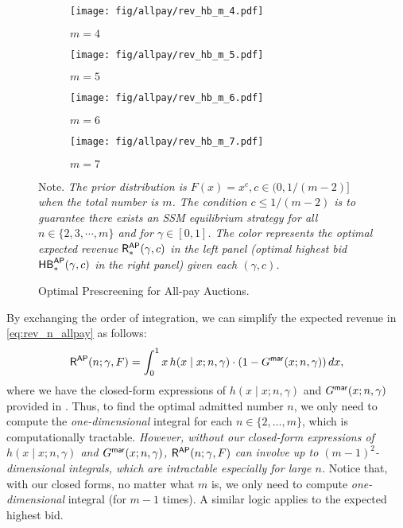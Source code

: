 \begin{figure}[ht]
    \centering
    \begin{subfigure}[b]{0.49\textwidth} %
    \texttt{[image: fig/allpay/rev\_hb\_m\_4.pdf]}
    \caption{$m=4$}
    \label{fig:rev_m_4_allpay}
    \end{subfigure}
    \hfill 
    \begin{subfigure}[b]{0.49\textwidth}
    \texttt{[image: fig/allpay/rev\_hb\_m\_5.pdf]}
    \caption{$m=5$}
    \label{fig:hb_m_5_allpay}
    \end{subfigure}

\begin{subfigure}[b]{0.49\textwidth}
    \texttt{[image: fig/allpay/rev\_hb\_m\_6.pdf]}
    \caption{$m=6$}
    \label{fig:hb_m_6_allpay}
    \end{subfigure}
    \hfill
    \begin{subfigure}[b]{0.49\textwidth}
    \texttt{[image: fig/allpay/rev\_hb\_m\_7.pdf]}
    \caption{$m=7$}
    \label{fig:hb_m_7_allpay}
    \end{subfigure}
    
    \caption{Optimal Prescreening for All-pay Auctions. 
    }
    \label{fig:general_m_allpay}
\vspace{0.5em}    
      Note. \textit{The prior distribution is $F(x)=x^c,c\in(0,1/(m-2)]$ when the total number is $m$. The condition $c\leq 1/(m-2)$ is to guarantee there exists an SSM equilibrium strategy for all $n\in\{2,3,\cdots,m\}$ and for {} $\gamma\in[0,1]$.
    The color represents the optimal expected revenue $\mathsf{R}_\ast^{\mathsf{AP}}(\gamma,c)$ in the left panel (optimal highest bid $\mathsf{HB}_\ast^{\mathsf{AP}}(\gamma,c)$ in the right panel) given each $(\gamma,c)$.}
\end{figure}


\begin{remark}
\label{remark:generalsetting_allpay}
By exchanging the order of integration, we can simplify the expected revenue in \eqref{eq:rev_n_allpay} as follows:
\begin{align*}
   \mathsf{R}^{\mathsf{AP}}(n;\gamma,F) = \int_0^1 x\, h(x\mid x;n,\gamma)\cdot \left(1-G^{\mathsf{mar}}(x;n,\gamma)\right)dx,
\end{align*}
where we have the closed-form expressions of $h(x\mid x;n,\gamma)$ and $G^{\mathsf{mar}}(x;n,\gamma)$ provided in . Thus, to find the optimal admitted number $n$, we only need to compute the \emph{one-dimensional} integral for each $n\in\{2,\ldots,m\}$, which is computationally tractable. 
\emph{However, without our closed-form expressions of $h(x\mid x;n,\gamma)$ and $G^{\mathsf{mar}}(x;n,\gamma)$, $\mathsf{R}^{\mathsf{AP}}(n;\gamma,F)$ can involve up to $(m-1)^2$-dimensional integrals, 
which are intractable especially for large $n$.}
Notice that, with our closed forms, no matter what $m$ is, we only need to compute \emph{one-dimensional} integral (for $m-1$ times).
A similar logic applies to the expected highest bid.
\end{remark}




